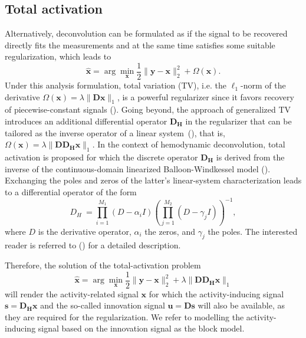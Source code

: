 \subsection{Total activation}
Alternatively, deconvolution can be formulated as if the signal to be recovered directly fits the measurements and at the same time satisfies some suitable regularization, which leads to
\begin{equation}
\label{eq:analysis_model}
    \hat{\mathbf{x}} = \arg \min_{\mathbf{x}} \frac{1}{2} \| \mathbf{y} - \mathbf{x} \|_2^2 + \Omega(\mathbf{x}).
\end{equation}
Under this analysis formulation, total variation (TV), i.e. the $\ell_1$-norm of the derivative $\Omega(\mathbf{x})=\lambda \|\mathbf{Dx}\|_1$, is a powerful regularizer since it favors recovery of piecewise-constant signals (\citealt{Chambolle2004TotalVariation}). Going beyond, the approach of generalized TV introduces an additional differential operator $\mathbf{D_H}$ in the regularizer that can be tailored as the inverse operator of a linear system~(\citealt{Karahanoglu2011SignalProcessingApproach}), that is, $\Omega(\mathbf{x})=\lambda \|\mathbf{D D_H x}\|_1$. In the context of hemodynamic deconvolution, total activation is proposed for which the discrete operator $\mathbf{D_H}$ is derived from the inverse of the continuous-domain linearized Balloon-Windkessel model (\citealt{Buxton1998BalloonModel,Friston2000Nonlinear-Balloon}).  Exchanging the poles and zeros of the latter's linear-system characterization leads to a differential operator of the form 
\begin{equation}
    D_H\ = \prod_{i=1}^{M_1} (D-\alpha_i I) (\prod_{j=1}^{M_2} (D - \gamma_j I))^{-1},
\end{equation}
where \(D\) is the derivative operator, \(\alpha_i\) the zeros, and \(\gamma_j\) the poles. The interested reader is referred to (\citealt{Khalidov2011ActiveletsWaveletssparse,Karahanoglu2013TotalactivationfMRI}) for a detailed description. 

Therefore, the solution of the total-activation problem
\begin{equation}
\label{eq:TA}
    \hat{\mathbf{x}} = \arg \min_{\mathbf{x}} \frac{1}{2} \| \mathbf{y} - \mathbf{x} \|_2^2 + \lambda \| \mathbf{D D_H x} \|_1
\end{equation}
will render the activity-related signal $\mathbf{x}$ for which the activity-inducing signal $\mathbf{s}=\mathbf{D_H x}$ and the so-called innovation signal $\mathbf{u}=\mathbf{Ds}$ will also be available, as they are required for the regularization. We refer to modelling the activity-inducing signal based on the innovation signal as the block model.

